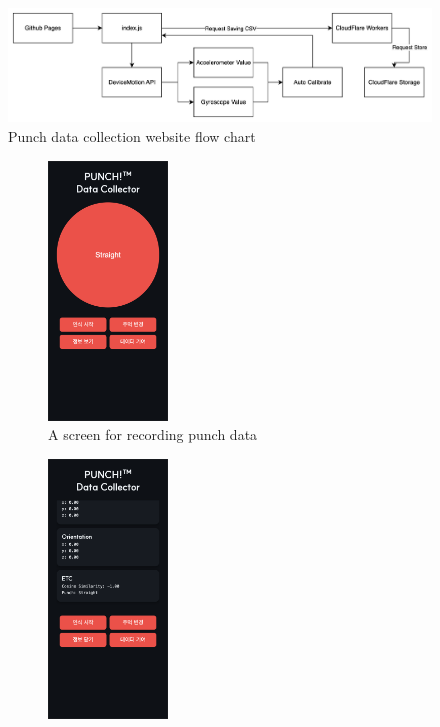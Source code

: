 \documentclass{article}
\begin{document}
    \FloatBarrier
    \begin{figure}[ht]
        \centering
        \includegraphics[width=\textwidth]{data_collection_flow_chart.png}
        \caption{Punch data collection website flow chart}
        \label{fig:data_collection_flow_chart}
    \end{figure}
    \FloatBarrier
    \begin{figure}[ht]
        \centering
        \begin{subfigure}
            {0.5\textwidth}
            \centering
            \includegraphics[width=0.35\textwidth]{data_collection_web.png}
            \caption{A screen for recording punch data}
            \label{fig:data_collection_web}
        \end{subfigure}%
        \begin{subfigure}
            {0.5\textwidth}
            \centering
            \includegraphics[width=0.35\textwidth]{data_collection_web_info.png}

\end{subfigure}
\end{figure}
\end{document}
